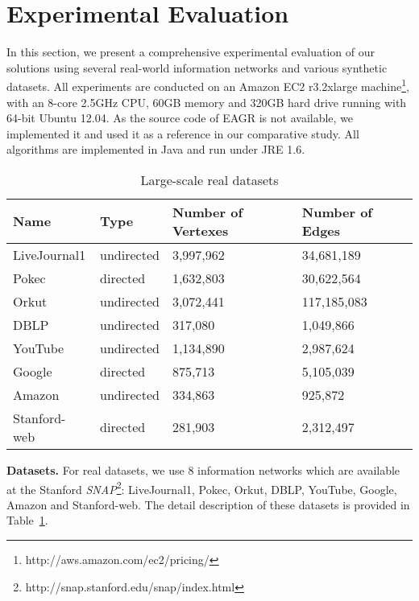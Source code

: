 \section{Experimental Evaluation}\label{sec:experiments}
In this section, we present a comprehensive experimental evaluation 
of our solutions using several real-world information networks and 
various synthetic datasets. 
All experiments are conducted on an 
Amazon EC2 r3.2xlarge machine\footnote{http://aws.amazon.com/ec2/pricing/}, 
with an 8-core 2.5GHz CPU, 60GB memory and 320GB hard drive 
running with 64-bit Ubuntu 12.04. As the source code of EAGR is not
available, we implemented it and used it as a reference in our comparative
study.  
All algorithms are implemented in Java and run under JRE 1.6.

\begin{table}[h]
\centering
\begin{tabular}{|l|l|l|l|}
\hline 
\rule[-1ex]{0pt}{2.5ex} Name & Type & Number of Vertexes & Number of Edges \\ 
\hline 
\rule[-1ex]{0pt}{2.5ex} LiveJournal1 & undirected & 3,997,962 & 34,681,189 \\ 
\hline 
\rule[-1ex]{0pt}{2.5ex} Pokec & directed & 1,632,803 & 30,622,564 \\ 
\hline 
\rule[-1ex]{0pt}{2.5ex} Orkut & undirected & 3,072,441 & 117,185,083 \\ 
\hline 
\rule[-1ex]{0pt}{2.5ex} DBLP & undirected & 317,080 & 1,049,866 \\ 
\hline 
\rule[-1ex]{0pt}{2.5ex} YouTube & undirected & 1,134,890 & 2,987,624 \\ 
\hline 
\rule[-1ex]{0pt}{2.5ex} Google & directed & 875,713 & 5,105,039 \\ 
\hline 
\rule[-1ex]{0pt}{2.5ex} Amazon & undirected & 334,863 & 925,872 \\ 
\hline 
\rule[-1ex]{0pt}{2.5ex} Stanford-web & directed & 281,903 &  2,312,497 \\ 
\hline 
\end{tabular}
\caption{Large-scale real datasets}
\label{tab:realdata}
\end{table}


\textbf{Datasets.} For real datasets, we use 8 information networks 
which are available at the Stanford \emph{SNAP}\footnote{http://snap.stanford.edu/snap/index.html}: 
LiveJournal1, Pokec, Orkut, DBLP, YouTube, Google, Amazon and Stanford-web. 
The detail description of these datasets is provided in 
Table~\ref{tab:realdata}. 

